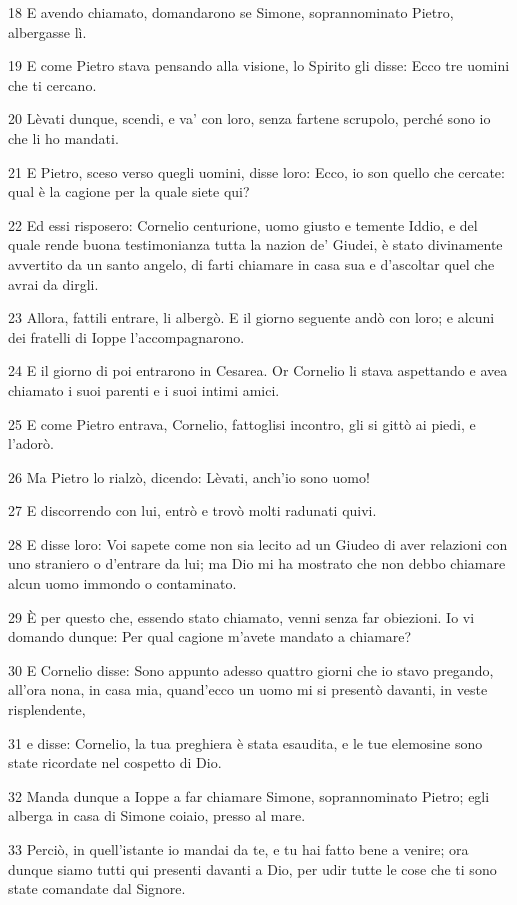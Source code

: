 \par 18 E avendo chiamato, domandarono se Simone, soprannominato Pietro, albergasse lì.
\par 19 E come Pietro stava pensando alla visione, lo Spirito gli disse: Ecco tre uomini che ti cercano.
\par 20 Lèvati dunque, scendi, e va' con loro, senza fartene scrupolo, perché sono io che li ho mandati.
\par 21 E Pietro, sceso verso quegli uomini, disse loro: Ecco, io son quello che cercate: qual è la cagione per la quale siete qui?
\par 22 Ed essi risposero: Cornelio centurione, uomo giusto e temente Iddio, e del quale rende buona testimonianza tutta la nazion de' Giudei, è stato divinamente avvertito da un santo angelo, di farti chiamare in casa sua e d'ascoltar quel che avrai da dirgli.
\par 23 Allora, fattili entrare, li albergò. E il giorno seguente andò con loro; e alcuni dei fratelli di Ioppe l'accompagnarono.
\par 24 E il giorno di poi entrarono in Cesarea. Or Cornelio li stava aspettando e avea chiamato i suoi parenti e i suoi intimi amici.
\par 25 E come Pietro entrava, Cornelio, fattoglisi incontro, gli si gittò ai piedi, e l'adorò.
\par 26 Ma Pietro lo rialzò, dicendo: Lèvati, anch'io sono uomo!
\par 27 E discorrendo con lui, entrò e trovò molti radunati quivi.
\par 28 E disse loro: Voi sapete come non sia lecito ad un Giudeo di aver relazioni con uno straniero o d'entrare da lui; ma Dio mi ha mostrato che non debbo chiamare alcun uomo immondo o contaminato.
\par 29 È per questo che, essendo stato chiamato, venni senza far obiezioni. Io vi domando dunque: Per qual cagione m'avete mandato a chiamare?
\par 30 E Cornelio disse: Sono appunto adesso quattro giorni che io stavo pregando, all'ora nona, in casa mia, quand'ecco un uomo mi si presentò davanti, in veste risplendente,
\par 31 e disse: Cornelio, la tua preghiera è stata esaudita, e le tue elemosine sono state ricordate nel cospetto di Dio.
\par 32 Manda dunque a Ioppe a far chiamare Simone, soprannominato Pietro; egli alberga in casa di Simone coiaio, presso al mare.
\par 33 Perciò, in quell'istante io mandai da te, e tu hai fatto bene a venire; ora dunque siamo tutti qui presenti davanti a Dio, per udir tutte le cose che ti sono state comandate dal Signore.
